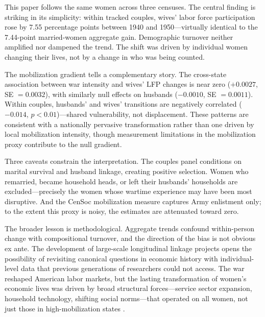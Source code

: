 \documentclass[12pt]{article}
\begin{document}
This paper follows the same women across three censuses. The central finding is striking in its simplicity: within tracked couples, wives' labor force participation rose by 7.55 percentage points between 1940 and 1950---virtually identical to the 7.44-point married-women aggregate gain. Demographic turnover neither amplified nor dampened the trend. The shift was driven by individual women changing their lives, not by a change in who was being counted.

The mobilization gradient tells a complementary story. The cross-state association between war intensity and wives' LFP changes is near zero ($+0.0027$, SE $= 0.0032$), with similarly null effects on husbands ($-0.0010$, SE $= 0.0011$). Within couples, husbands' and wives' transitions are negatively correlated ($-0.014$, $p < 0.01$)---shared vulnerability, not displacement. These patterns are consistent with a nationally pervasive transformation rather than one driven by local mobilization intensity, though measurement limitations in the mobilization proxy contribute to the null gradient.

Three caveats constrain the interpretation. The couples panel conditions on marital survival and husband linkage, creating positive selection. Women who remarried, became household heads, or left their husbands' households are excluded---precisely the women whose wartime experience may have been most disruptive. And the CenSoc mobilization measure captures Army enlistment only; to the extent this proxy is noisy, the estimates are attenuated toward zero.

The broader lesson is methodological. Aggregate trends confound within-person change with compositional turnover, and the direction of the bias is not obvious ex ante. The development of large-scale longitudinal linkage projects opens the possibility of revisiting canonical questions in economic history with individual-level data that previous generations of researchers could not access. The war reshaped American labor markets, but the lasting transformation of women's economic lives was driven by broad structural forces---service sector expansion, household technology, shifting social norms---that operated on all women, not just those in high-mobilization states \citep{greenwood2005engines, goldin2006quiet}.

\label{apep_main_text_end}




\end{document}
